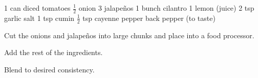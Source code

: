 \dishtype{\vegetarian, \apps}
\begin{ingreds}
    1 can diced tomatoes
    $\frac{1}{2}$ onion
    3 jalape\~nos
    1 bunch cilantro
    1 lemon (juice)
    2 tsp garlic salt
    1 tsp cumin
    $\frac{1}{2}$ tsp cayenne pepper
    back pepper (to taste)
\end{ingreds}
\begin{method}
    Cut the onions and jalape\~nos into large chunks and place into a food processor.\par
    Add the rest of the ingredients.\par
    Blend to desired consistency.
\end{method}